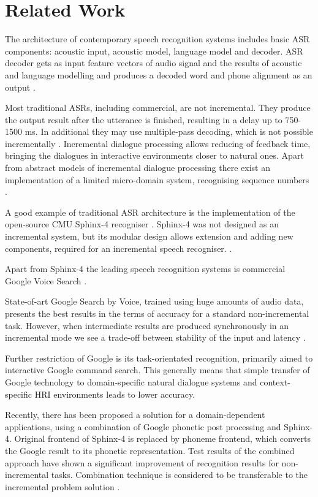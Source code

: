\chapter {Related Work}
\label{ch:relatedWork}
The architecture of  contemporary speech recognition systems includes basic ASR
components: acoustic input, acoustic model, language model and decoder.
ASR decoder gets as input feature vectors of audio signal and the results
of acoustic and language modelling and produces a decoded word and
phone alignment as an output \parencite {jurafskymartin2009}.

Most traditional ASRs, including commercial, are not incremental. They produce
the output result after the utterance is finished, resulting in a delay up to
750-1500 ms. In additional they may use multiple-pass decoding, which is not
possible incrementally \parencite {skantzeschlangen2009}.
Incremental dialogue processing allows reducing of feedback time, bringing the
dialogues in interactive environments closer to natural ones.
Apart from abstract models of incremental dialogue processing there exist an
implementation  of a limited micro-domain system, recognising sequence
numbers \parencite {skantzeschlangen2009}.

A good example of  traditional ASR architecture is the implementation of the
open-source CMU Sphinx-4 recogniser \parencite {Lamereetal2013:Eurospeech}.
Sphinx-4 was not designed as an incremental system, but its modular design 
allows extension and adding new components, required for an incremental speech recogniser. 
\parencite {baumannetal2009:naacl}.

Apart from Sphinx-4 the leading speech recognition systems is commercial
Google Voice Search \parencite{schalkwyk2010}.

State-of-art Google Search by Voice, trained using huge amounts of audio data,
presents the best results in the terms of accuracy for a
standard non-incremental task. However, when intermediate results are produced
synchronously in an incremental mode we see a trade-off between stability of the
input and latency \parencite {mcgrawgrauenstein2012}. 

Further restriction of Google is its task-orientated recognition, primarily 
aimed to interactive Google command search. This generally means that simple
transfer of Google technology to domain-specific natural dialogue systems and
context-specific HRI environments leads to lower accuracy. 

Recently, there has been proposed a solution for a domain-dependent
applications, using a combination of Google phonetic post processing and
Sphinx-4. Original frontend of Sphinx-4 is replaced by phoneme frontend, which
converts the Google result to its phonetic representation. Test
results of the combined approach have shown a significant improvement of
recognition results for non-incremental tasks.
Combination technique is considered to be transferable to the
incremental problem solution \parencite {twiefeletal2014}.
